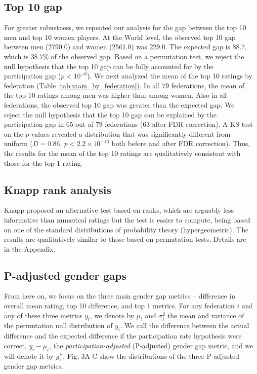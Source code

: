\documentclass[9pt,twocolumn,twoside,lineno]{pnas-new}
\begin{document}
\subsection*{Top 10 gap}
For greater robustness, we repeated our analysis for the gap between the top 10 men and top 10 women players. At the World level, the observed top 10 gap between men (2790.0) and women (2561.0) was 229.0. The expected gap is 88.7, which is $38.7\%$ of the observed gap. Based on a permutation test, we reject the null hypothesis that the top 10 gap can be fully accounted for by the participation gap ($p < 10^{-6}$). We next analyzed the mean of the top 10 ratings by federation (Table \ref{tab:main_by_federation}). In all 79 federations, the mean of the top 10 ratings among men was higher than among women. Also in all federations, the observed top 10 gap was greater than the expected gap. We reject the null hypothesis that the top 10 gap can be explained by the participation gap in 65 out of 79 federations (63 after FDR correction). A KS test on the $p$-values revealed a distribution that was significantly different from uniform ($D=0.86$, $p < 2.2\times 10^{-16}$ both before and after FDR correction). Thus, the results for the mean of the top 10 ratings are qualitatively consistent with those for the top 1 rating.




\subsection*{Knapp rank analysis}
Knapp \cite{knapp2010prsb} proposed an alternative test based on ranks, which are arguably less informative than numerical ratings but the test is easier to compute, being based on one of the standard distributions of probability theory (hypergeometric). The results are qualitatively similar to those based on permutation tests. Details are in the Appendix.




\subsection*{P-adjusted gender gaps}
From here on, we focus on the three main gender gap metrics -- difference in overall mean rating, top 10 difference, and top 1 metrics.
For  any federation $i$ and any of these three metrics $y_i$, we denote by $\mu_i$ and $\sigma_i^2$ the mean and variance of the permutation null distribution of $y_i$. We call the difference between the actual difference and the expected difference if the participation rate hypothesis were correct, $y_i-\mu_i$, the {\it participation-adjusted} (P-adjusted) gender gap metric, and we will denote it by $y^\text{P}_i$. Fig. 3A-C show the distributions of the three P-adjusted gender gap metrics.
\end{document}
